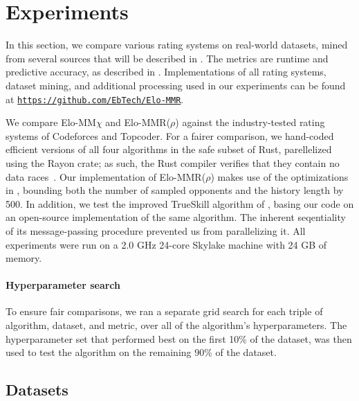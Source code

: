 \section{Experiments}
\label{sec:experiments}
In this section, we compare various rating systems on real-world datasets, mined from several sources that will be described in . The metrics are runtime and predictive accuracy, as described in . Implementations of all rating systems, dataset mining, and additional processing used in our experiments can be found at {\tt\url{https://github.com/EbTech/Elo-MMR}}.

We compare Elo-MM$\chi$ and Elo-MMR($\rho$) against the industry-tested rating systems of Codeforces and Topcoder. For a fairer comparison, we hand-coded efficient versions of all four algorithms in the safe subset of Rust, parellelized using the Rayon crate; as such, the Rust compiler verifies that they contain no data races~\cite{stone2017rayon}. Our implementation of Elo-MMR($\rho$) makes use of the optimizations in , bounding both the number of sampled opponents and the history length by 500. In addition, we test the improved TrueSkill algorithm of \cite{NS10}, basing our code on an open-source implementation of the same algorithm. The inherent seqentiality of its message-passing procedure prevented us from parallelizing it. All experiments were run on a 2.0 GHz 24-core Skylake machine with 24 GB of memory.

\paragraph{Hyperparameter search}
To ensure fair comparisons, we ran a separate grid search for each triple of algorithm, dataset, and metric, over all of the algorithm's hyperparameters. The hyperparameter set that performed best on the first 10\% of the dataset, was then used to test the algorithm on the remaining 90\% of the dataset. 


\subsection{Datasets}
\label{sec:datasets}

